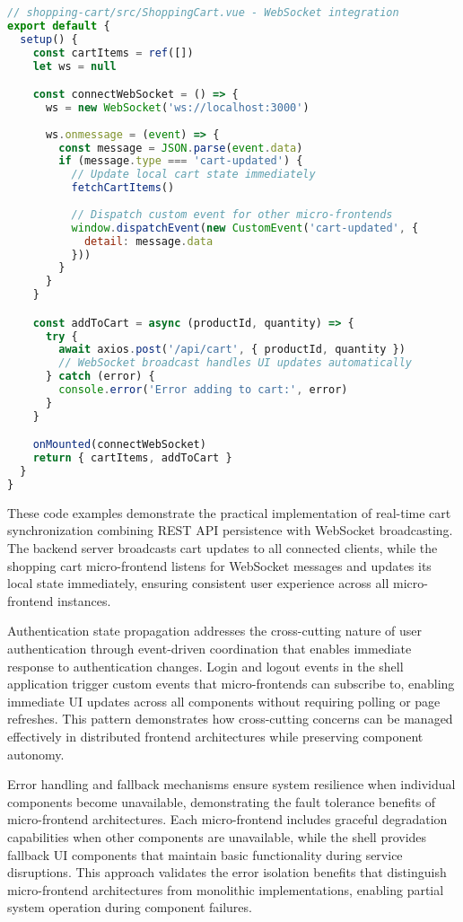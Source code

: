 \documentclass[12pt,a4paper]{report}
\begin{document}
\begin{lstlisting}[language=JavaScript, caption=WebSocket Event Handling - Shopping Cart Micro-Frontend]
// shopping-cart/src/ShoppingCart.vue - WebSocket integration
export default {
  setup() {
    const cartItems = ref([])
    let ws = null

    const connectWebSocket = () => {
      ws = new WebSocket('ws://localhost:3000')
      
      ws.onmessage = (event) => {
        const message = JSON.parse(event.data)
        if (message.type === 'cart-updated') {
          // Update local cart state immediately
          fetchCartItems()
          
          // Dispatch custom event for other micro-frontends
          window.dispatchEvent(new CustomEvent('cart-updated', { 
            detail: message.data 
          }))
        }
      }
    }

    const addToCart = async (productId, quantity) => {
      try {
        await axios.post('/api/cart', { productId, quantity })
        // WebSocket broadcast handles UI updates automatically
      } catch (error) {
        console.error('Error adding to cart:', error)
      }
    }

    onMounted(connectWebSocket)
    return { cartItems, addToCart }
  }
}
\end{lstlisting}

These code examples demonstrate the practical implementation of real-time cart synchronization combining REST API persistence with WebSocket broadcasting. The backend server broadcasts cart updates to all connected clients, while the shopping cart micro-frontend listens for WebSocket messages and updates its local state immediately, ensuring consistent user experience across all micro-frontend instances.

Authentication state propagation addresses the cross-cutting nature of user authentication through event-driven coordination that enables immediate response to authentication changes. Login and logout events in the shell application trigger custom events that micro-frontends can subscribe to, enabling immediate UI updates across all components without requiring polling or page refreshes. This pattern demonstrates how cross-cutting concerns can be managed effectively in distributed frontend architectures while preserving component autonomy.

Error handling and fallback mechanisms ensure system resilience when individual components become unavailable, demonstrating the fault tolerance benefits of micro-frontend architectures. Each micro-frontend includes graceful degradation capabilities when other components are unavailable, while the shell provides fallback UI components that maintain basic functionality during service disruptions. This approach validates the error isolation benefits that distinguish micro-frontend architectures from monolithic implementations, enabling partial system operation during component failures.
\end{document}

